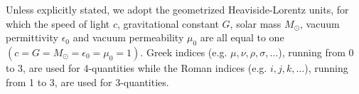 
\begin{conventions}
Unless explicitly stated, we adopt the geometrized Heaviside-Lorentz units,
for which the speed of light $c$, gravitational constant $G$, solar mass $M_\odot$,
vacuum permittivity $\epsilon_0$ and vacuum permeability $\mu_0$ are all equal to one
$(c=G=M_\odot =\epsilon_0 =\mu_0 =1)$.
Greek indices (e.g. $\mu, \nu, \rho, \sigma, \dots$), 
running from 0 to 3,
are used for 4-quantities 
while the Roman indices (e.g. $i,j,k,\dots$), 
running from 1 to 3, are used for 3-quantities.

\end{conventions}
